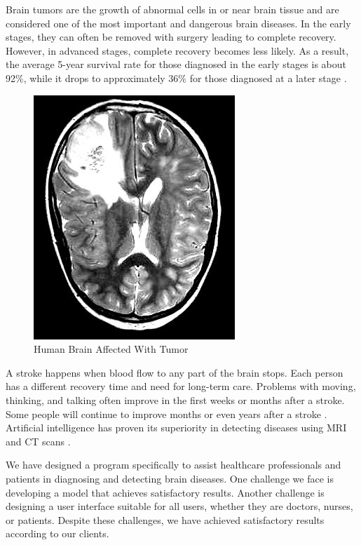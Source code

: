 \documentclass[conference]{IEEEtran}
\begin{document}
Brain tumors are the growth of abnormal cells in or near brain tissue and are considered one of the most important
and dangerous brain diseases. In the early stages, they can often be removed with surgery leading to complete recovery.
However, in advanced stages, complete recovery becomes less likely. As a result, the average 5-year survival rate for those diagnosed in the early stages is about 92\%,
while it drops to approximately 36\% for those diagnosed at a later stage \cite{Kang2023, kang2023bgfyolo}.

\begin{figure}
    \centering
    \includegraphics[scale=0.5]{figures/brain_with_tumor.jpg}
    \caption{Human Brain Affected With Tumor \cite{br35h}}
    \label{fig:brain_with_tumor}
\end{figure}

A stroke happens when blood flow to any part of the brain stops. Each person has a different recovery time and need for long-term care.
Problems with moving, thinking, and talking often improve in the first weeks or months after a stroke. 
Some people will continue to improve months or even years after a stroke \cite{jocher2022yolo5, iandola2014densenet}. 
Artificial intelligence has proven its superiority in detecting diseases using MRI and CT scans \cite{ABDELMAKSOUD201571-51, chen791-53}.

We have designed a program specifically to assist healthcare professionals and patients in diagnosing and detecting brain diseases.
One challenge we face is developing a model that achieves satisfactory results.
Another challenge is designing a user interface suitable for all users, whether they are doctors, nurses, or patients.
Despite these challenges, we have achieved satisfactory results according to our clients.
\end{document}
